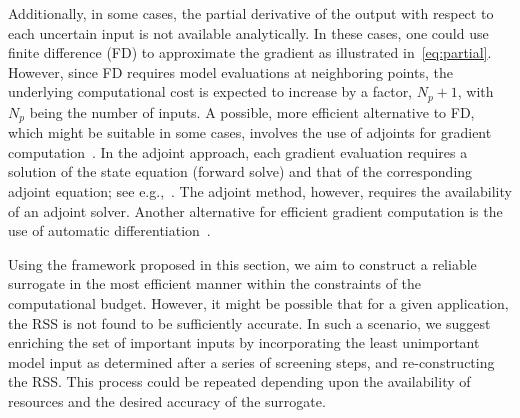 Additionally, in some cases, the partial
derivative of the output with respect to each uncertain input is not available
analytically. In these cases, one could use finite difference (FD) to approximate
the gradient as illustrated in~\ref{eq:partial}. However, since FD requires
model evaluations at neighboring points, the underlying computational cost is
expected to increase by a factor, $N_p+1$, with $N_p$ being the number of inputs. 
A possible, more efficient alternative to FD, which might be suitable in some cases, involves the use of adjoints for
gradient computation~\cite{Griewank:2008}. In the adjoint approach, each
gradient evaluation requires 
a solution of the state equation (forward solve) and that of the 
corresponding adjoint equation; 
see e.g.,~\cite{jameson1988aerodynamic,gunzburger2003perspectives,Borzi2011}.
The adjoint method, however, requires the availability of an adjoint solver.
Another alternative for efficient gradient computation is the use of 
automatic differentiation~\cite{Kiparissides:2009}.

Using the framework proposed in this section, we aim to construct a reliable
surrogate in the most efficient manner within the constraints of the computational
budget. However, it might be possible that for a given application, the RSS is not
found to be sufficiently accurate. In such a scenario, we suggest enriching the
set of important inputs by incorporating the least unimportant model input
as determined after a series of screening steps, and re-constructing the RSS. 
This process could be repeated depending upon the availability of resources
and the desired accuracy of the surrogate.  


